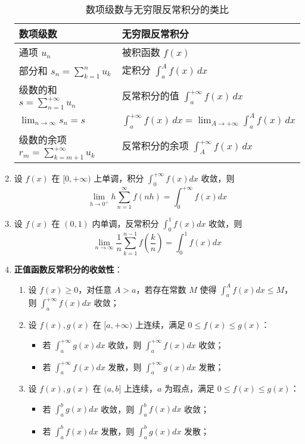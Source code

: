 \documentclass[UTF8]{ctexart}
\theoremstyle{remark}
\begin{document}
\begin{enumerate}
	\begin{table}[H]
		\centering
		\begin{tabular}{ll}
			\toprule
			数项级数 & 无穷限反常积分 \\
			\midrule
			通项 $u_n$ & 被积函数 $f(x)$ \\
			部分和 $s_n = \sum_{k=1}^{n} u_k$ & 定积分 $\int_{a}^{A} f(x)\,dx$ \\
			级数的和 $s = \sum_{n=1}^{+\infty} u_n$ & 反常积分的值 $\int_{a}^{+\infty} f(x)\,dx$ \\
			$\lim_{n \to \infty} s_n = s$ & $\int_{a}^{+\infty} f(x)\,dx = \lim_{A \to +\infty} \int_{a}^{A} f(x)\,dx$ \\
			级数的余项 $r_m = \sum_{k=m+1}^{+\infty} u_k$ & 反常积分的余项 $\int_{A}^{+\infty} f(x)\,dx$ \\
			\bottomrule
		\end{tabular}
		\caption{数项级数与无穷限反常积分的类比}
	\end{table}
	
	
	\item 设 \(f(x)\) 在 \([0, +\infty)\) 上单调，积分 \(\int_{0}^{+\infty} f(x) dx\) 收敛，则
	\[
	\lim_{h \to 0^{+}} h \sum_{n=1}^{\infty} f(nh) = \int_{0}^{+\infty} f(x) dx
	\]
	
	\item 设 \(f(x)\) 在 \((0, 1)\) 内单调，反常积分 \(\int_{0}^{1} f(x) dx\) 收敛，则
	\[
	\lim_{n \to \infty} \frac{1}{n} \sum_{k=1}^{n-1} f\left(\frac{k}{n}\right) = \int_{0}^{1} f(x) dx
	\]
	
	\item \textbf{正值函数反常积分的收敛性}：
	\begin{enumerate}
		\item 设 \(f(x) \geq 0\)，对任意 \(A > a\)，若存在常数 \(M\) 使得 \(\int_{a}^{A} f(x) dx \leq M\)，则 \(\int_{a}^{+\infty} f(x) dx\) 收敛；
		\item 设 \(f(x), g(x)\) 在 \([a, +\infty)\) 上连续，满足 \(0 \leq f(x) \leq g(x)\)：
		\begin{itemize}
			\item 若 \(\int_{a}^{+\infty} g(x) dx\) 收敛，则 \(\int_{a}^{+\infty} f(x) dx\) 收敛；
			\item 若 \(\int_{a}^{+\infty} f(x) dx\) 发散，则 \(\int_{a}^{+\infty} g(x) dx\) 发散；
		\end{itemize}
		\item 设 \(f(x), g(x)\) 在 \((a, b]\) 上连续，\(a\) 为瑕点，满足 \(0 \leq f(x) \leq g(x)\)：
		\begin{itemize}
			\item 若 \(\int_{a}^{b} g(x) dx\) 收敛，则 \(\int_{a}^{b} f(x) dx\) 收敛；
			\item 若 \(\int_{a}^{b} f(x) dx\) 发散，则 \(\int_{a}^{b} g(x) dx\) 发散；
		\end{itemize}
	\end{enumerate}


\end{enumerate}
\end{document}
